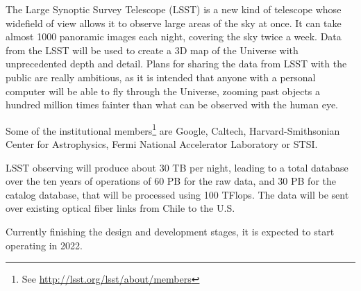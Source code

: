 The Large Synoptic Survey Telescope (LSST) is a new kind of telescope whose widefield of view allows it to observe large areas of the sky at once. It can take almost 1000 panoramic images each night,
covering %
the sky twice a week. Data from
the
LSST will be used to create a 3D map of the Universe with unprecedented depth and detail. Plans for sharing the data from LSST with the public are really ambitious, as it is intended that anyone with a
personal computer %
will be able to %
fly through the Universe, zooming past objects a hundred million times fainter than
what
can be observed with the human eye. 

Some of the institutional members\footnote{See \url{http://lsst.org/lsst/about/members}} are Google, Caltech, Harvard-Smithsonian Center for Astrophysics, Fermi National Accelerator Laboratory or STSI.  


LSST observing will produce about 30 TB per night, leading to a total database over the ten years of operations of 60 PB for the raw data, and 30 PB for the catalog database, that will be processed using 100 TFlops. The data will be sent over existing optical fiber links from Chile to the U.S. 

Currently finishing the design and development stages, it is expected to start operating in 2022.

